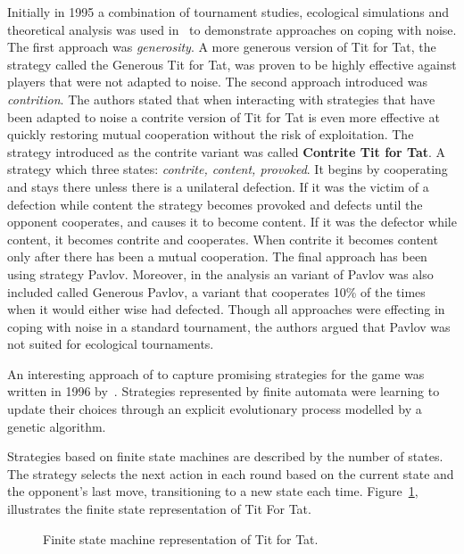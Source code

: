\documentclass{article}
\theoremstyle{definition}
\begin{document}
Initially in 1995 a combination of tournament studies, ecological simulations
and theoretical analysis was used in~\cite{Wu1995} to demonstrate approaches on
coping with noise. The first approach was \textit{generosity}. A more generous version
of Tit for Tat, the strategy called the Generous Tit for Tat, was proven to be
highly effective against players that were not adapted to noise. The second
approach introduced was \textit{contrition}. The authors stated that when
interacting with strategies that have been adapted to noise a contrite version 
of Tit for Tat is even more effective at quickly restoring mutual cooperation 
without the risk of exploitation. The strategy introduced as the contrite variant
was called \textbf{Contrite Tit for Tat}. A strategy which three states:
\textit{contrite, content, provoked}. It begins by cooperating and stays there unless
there is a unilateral defection. If it was the victim of a defection while content
the strategy becomes provoked and defects until the opponent cooperates, and 
causes it to become content. If it was the defector while content, it
becomes contrite and cooperates. When contrite it becomes content only after
there has been a mutual cooperation. The final approach has been using strategy
Pavlov. Moreover, in the analysis an variant of Pavlov was also included
called Generous Pavlov, a variant that cooperates 10\% of the times when it 
would either wise had defected. Though all approaches were effecting in coping
with noise in a standard tournament, the authors argued that Pavlov was not 
suited for ecological tournaments.

An interesting approach of to capture promising strategies for the game
was written in 1996 by~\cite{Miller1996}. Strategies represented by finite automata
were learning to update their choices through an explicit evolutionary process
modelled by a genetic algorithm.

Strategies based on finite state machines are described by the number of states.
The strategy selects the next action in each round based on the current state
and the opponent's last move, transitioning to a new state each time.
Figure~\ref{fig:tit_for_tat_fsm}, illustrates the finite state representation
of Tit For Tat.

\begin{figure}[!hbtp]
    \centering
    
    \caption{Finite state machine representation of Tit for Tat.}
    \label{fig:tit_for_tat_fsm}
\end{figure}
\end{document}
